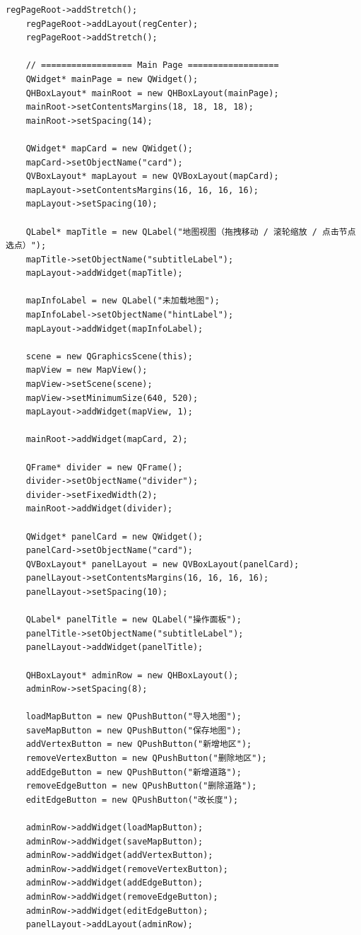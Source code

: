 \documentclass[UTF8,12pt,a4paper]{ctexart}
\begin{document}
\begin{lstlisting}[caption={mainwindow.cpp 源码}]
    regPageRoot->addStretch();
    regPageRoot->addLayout(regCenter);
    regPageRoot->addStretch();

    // ================== Main Page ==================
    QWidget* mainPage = new QWidget();
    QHBoxLayout* mainRoot = new QHBoxLayout(mainPage);
    mainRoot->setContentsMargins(18, 18, 18, 18);
    mainRoot->setSpacing(14);

    QWidget* mapCard = new QWidget();
    mapCard->setObjectName("card");
    QVBoxLayout* mapLayout = new QVBoxLayout(mapCard);
    mapLayout->setContentsMargins(16, 16, 16, 16);
    mapLayout->setSpacing(10);

    QLabel* mapTitle = new QLabel("地图视图（拖拽移动 / 滚轮缩放 / 点击节点选点）");
    mapTitle->setObjectName("subtitleLabel");
    mapLayout->addWidget(mapTitle);

    mapInfoLabel = new QLabel("未加载地图");
    mapInfoLabel->setObjectName("hintLabel");
    mapLayout->addWidget(mapInfoLabel);

    scene = new QGraphicsScene(this);
    mapView = new MapView();
    mapView->setScene(scene);
    mapView->setMinimumSize(640, 520);
    mapLayout->addWidget(mapView, 1);

    mainRoot->addWidget(mapCard, 2);

    QFrame* divider = new QFrame();
    divider->setObjectName("divider");
    divider->setFixedWidth(2);
    mainRoot->addWidget(divider);

    QWidget* panelCard = new QWidget();
    panelCard->setObjectName("card");
    QVBoxLayout* panelLayout = new QVBoxLayout(panelCard);
    panelLayout->setContentsMargins(16, 16, 16, 16);
    panelLayout->setSpacing(10);

    QLabel* panelTitle = new QLabel("操作面板");
    panelTitle->setObjectName("subtitleLabel");
    panelLayout->addWidget(panelTitle);

    QHBoxLayout* adminRow = new QHBoxLayout();
    adminRow->setSpacing(8);

    loadMapButton = new QPushButton("导入地图");
    saveMapButton = new QPushButton("保存地图");
    addVertexButton = new QPushButton("新增地区");
    removeVertexButton = new QPushButton("删除地区");
    addEdgeButton = new QPushButton("新增道路");
    removeEdgeButton = new QPushButton("删除道路");
    editEdgeButton = new QPushButton("改长度");

    adminRow->addWidget(loadMapButton);
    adminRow->addWidget(saveMapButton);
    adminRow->addWidget(addVertexButton);
    adminRow->addWidget(removeVertexButton);
    adminRow->addWidget(addEdgeButton);
    adminRow->addWidget(removeEdgeButton);
    adminRow->addWidget(editEdgeButton);
    panelLayout->addLayout(adminRow);


\end{lstlisting}
\end{document}
